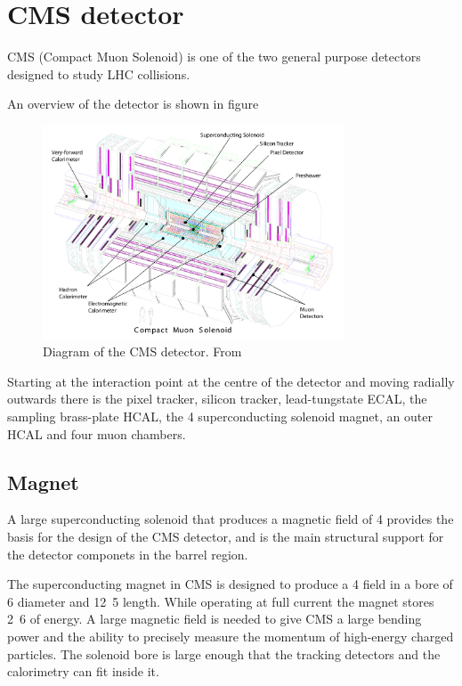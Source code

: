 \section{CMS detector}
CMS (Compact Muon Solenoid)\cite{cms} is one of the two general purpose
detectors designed to study LHC collisions. 

An overview of the detector is shown in figure 
\begin{figure}[htb!]
  \centering
  \includegraphics[width=0.8\textwidth]{cms}
  \caption{Diagram of the CMS detector. From \cite{cms}}
  \label{fig:CMSnc}
\end{figure}

Starting at the interaction point at the centre of the detector and moving
radially outwards there is the pixel tracker, silicon tracker, lead-tungstate
ECAL, the sampling brass-plate HCAL, the \unit{4}{\tesla} superconducting
solenoid magnet, an outer HCAL and four muon chambers.

\subsection{Magnet}
A large superconducting solenoid that produces a magnetic field of
\unit{4}{\tesla} provides the basis for the design of the CMS detector, and is
the main structural support for the detector componets in the barrel region.

The superconducting magnet in CMS is designed to produce a \unit{4}{\tesla}
field in a bore of 
\unit{6}{\meter} diameter and \unit{12.5}{\meter} length.
While operating at full current the magnet stores \unit{2.6}{\giga\joule} of 
energy.
A large magnetic field is needed to give CMS a large bending power and the
ability to precisely measure the momentum of high-energy charged particles.
The solenoid bore is large enough that the tracking detectors and the
calorimetry can fit inside it.\cite{cms}


